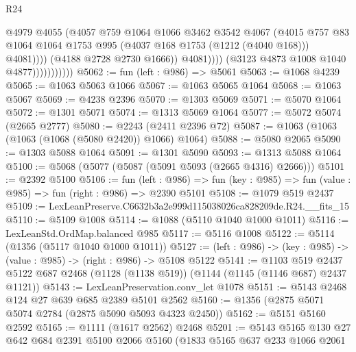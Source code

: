 \begin{lexlean}{R24}
\begin{coremodule}
                                      @4979
                                      @4055
                                      (@4057
                                        @759
                                        @1064
                                        @1066
                                        @3462
                                        @3542
                                        @4067
                                        (@4015
                                          @757
                                          @83
                                          @1064
                                          @1064
                                          @1753
                                          @995
                                          (@4037 @168 @1753 (@1212 (@4040 @168)))
                                          @4081))))
                                  (@4188 @2728 @2730 @1666))
                                @4081))))
                        (@3123 @4873 @1008 @1040 @4877)))))))))))
@5062 := fun (left : @986) => @5061
@5063 := @1068 @4239
@5065 := @1063 @5063 @1066
@5067 := @1063 @5065 @1064
@5068 := @1063 @5067
@5069 := @4238 @2396
@5070 := @1303 @5069
@5071 := @5070 @1064
@5072 := @1301 @5071
@5074 := @1313 @5069 @1064
@5077 := @5072 @5074 (@2665 @2777)
@5080 := @2243 (@2411 @2396 @72)
@5087 := @1063 (@1063 (@1063 (@1068 (@5080 @2420)) @1066) @1064)
@5088 := @5080 @2065
@5090 := @1303 @5088 @1064
@5091 := @1301 @5090
@5093 := @1313 @5088 @1064
@5100 := @5068 (@5077 (@5087 (@5091 @5093 (@2665 @4316) @2666)))
@5101 := @2392 @5100
@5106 := fun (left : @986) =>
  fun (key : @985) => fun (value : @985) => fun (right : @986) => @2390 @5101
@5108 := @1079 @519 @2437
@5109 := LexLeanPreserve.C6632b3a2e999d115038026ca828209de.R24.__fits_15
@5110 := @5109 @1008
@5114 := @1088 (@5110 @1040 @1000 @1011)
@5116 := LexLeanStd.OrdMap.balanced @985
@5117 := @5116 @1008
@5122 := @5114 (@1356 (@5117 @1040 @1000 @1011))
@5127 := (left : @986) -> (key : @985) -> (value : @985) -> (right : @986) -> @5108 @5122
@5141 := @1103
    @519
    @2437
    @5122
    @687
    @2468
    (@1128 (@1138 @519))
    (@1144 (@1145 (@1146 @687) @2437 @1121))
@5143 := LexLeanPreservation.conv_let @1078
@5151 := @5143 @2468 @124 @27 @639 @685 @2389 @5101 @2562
@5160 := @1356 (@2875 @5071 @5074 @2784 (@2875 @5090 @5093 @4323 @2450))
@5162 := @5151 @5160 @2592
@5165 := @1111 (@1617 @2562) @2468
@5201 := @5143
    @5165
    @130
    @27
    @642
    @684
    @2391
    @5100
    @2066
    @5160
    (@1833
      @5165
      @637
      @233
      @1066
      @2061

\end{coremodule}
\end{lexlean}
